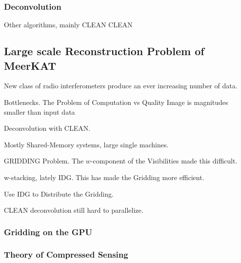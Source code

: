 \subsubsection{ Deconvolution}
Other algorithms, mainly CLEAN
CLEAN




\subsection{Large scale Reconstruction Problem of MeerKAT}
New class of radio interferometers produce an ever increasing number of data.

Bottlenecks.
The Problem of Computation vs Quality
Image is magnitudes smaller than input data

Deconvolution with CLEAN.

Mostly Shared-Memory systems, large single machines.

GRIDDING Problem. The $w$-component of the Visibilities made this difficult. 

w-stacking, lately IDG. This has made the Gridding more efficient.

Use IDG to Distribute the Gridding.




CLEAN deconvolution still hard to parallelize.


\subsubsection{Gridding on the GPU}

\subsubsection{Theory of Compressed Sensing}











